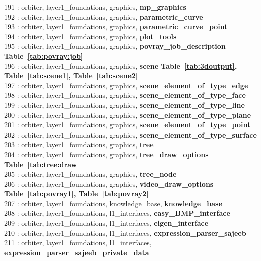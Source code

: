 191 : orbiter, layer1\_foundations, graphics, {\bf mp\_graphics}\\
192 : orbiter, layer1\_foundations, graphics, {\bf parametric\_curve}\\
193 : orbiter, layer1\_foundations, graphics, {\bf parametric\_curve\_point}\\
194 : orbiter, layer1\_foundations, graphics, {\bf plot\_tools}\\
195 : orbiter, layer1\_foundations, graphics, {\bf povray\_job\_description Table~\ref{tab:povray:job}}\\
196 : orbiter, layer1\_foundations, graphics, {\bf scene Table~\ref{tab:3doutput},  Table~\ref{tab:scene1},  Table~\ref{tab:scene2}}\\
197 : orbiter, layer1\_foundations, graphics, {\bf scene\_element\_of\_type\_edge}\\
198 : orbiter, layer1\_foundations, graphics, {\bf scene\_element\_of\_type\_face}\\
199 : orbiter, layer1\_foundations, graphics, {\bf scene\_element\_of\_type\_line}\\
200 : orbiter, layer1\_foundations, graphics, {\bf scene\_element\_of\_type\_plane}\\
201 : orbiter, layer1\_foundations, graphics, {\bf scene\_element\_of\_type\_point}\\
202 : orbiter, layer1\_foundations, graphics, {\bf scene\_element\_of\_type\_surface}\\
203 : orbiter, layer1\_foundations, graphics, {\bf tree}\\
204 : orbiter, layer1\_foundations, graphics, {\bf tree\_draw\_options Table~\ref{tab:tree:draw}}\\
205 : orbiter, layer1\_foundations, graphics, {\bf tree\_node}\\
206 : orbiter, layer1\_foundations, graphics, {\bf video\_draw\_options Table~\ref{tab:povray1},  Table~\ref{tab:povray2}}\\
207 : orbiter, layer1\_foundations, knowledge\_base, {\bf knowledge\_base}\\
208 : orbiter, layer1\_foundations, l1\_interfaces, {\bf easy\_BMP\_interface}\\
209 : orbiter, layer1\_foundations, l1\_interfaces, {\bf eigen\_interface}\\
210 : orbiter, layer1\_foundations, l1\_interfaces, {\bf expression\_parser\_sajeeb}\\
211 : orbiter, layer1\_foundations, l1\_interfaces, {\bf expression\_parser\_sajeeb\_private\_data}\\
